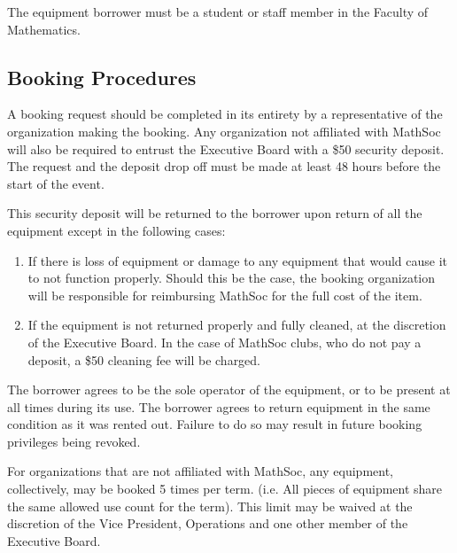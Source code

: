 The equipment borrower must be a student or staff member in the Faculty of Mathematics.

\subsection{Booking Procedures}

A booking request should be completed in its entirety by a
representative of the organization making the booking. Any organization not
affiliated with MathSoc will also be required to entrust the Executive Board
with a \$50 security deposit. The request and the deposit drop off must be made
at least 48 hours before the start of the event.

This security deposit will be returned to the borrower upon return of all the
equipment except in the following cases:

\begin{enumerate}
  \item If there is loss of equipment or damage to any equipment that would cause it to not function
    properly. Should this be the case, the booking organization will be
    responsible for reimbursing MathSoc for the full cost of the item.
  \item If the equipment is not returned properly and fully cleaned, at the
    discretion of the Executive Board. In the case of MathSoc clubs, who do not
   pay a deposit, a \$50 cleaning fee will be charged.
\end{enumerate}

The borrower agrees to be the sole operator of the equipment, or to be present
at all times during its use. The borrower agrees to return equipment in the same condition as it was rented out. Failure to do so may result in future booking privileges being revoked.

For organizations that are not affiliated with MathSoc, any equipment,
collectively, may be booked 5 times per term. (i.e. All pieces of equipment
share the same allowed use count for the term). This limit may be waived at the
discretion of the Vice President, Operations and one other member of the
Executive Board.

